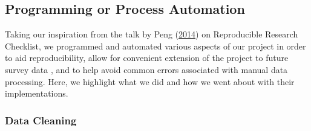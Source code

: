 \documentclass[
  10pt,
]{article}
\begin{document}
\hypertarget{programming-or-process-automation}{%
\subsection{Programming or Process Automation}\label{programming-or-process-automation}}

Taking our inspiration from the talk by Peng (\protect\hyperlink{ref-peng}{2014}) on Reproducible Research Checklist, we programmed and automated various aspects of our project in order to aid reproducibility, allow for convenient extension of the project to future survey data , and to help avoid common errors associated with manual data processing. Here, we highlight what we did and how we went about with their implementations.

\hypertarget{data-cleaning}{%
\subsubsection{Data Cleaning}\label{data-cleaning}}
\end{document}
